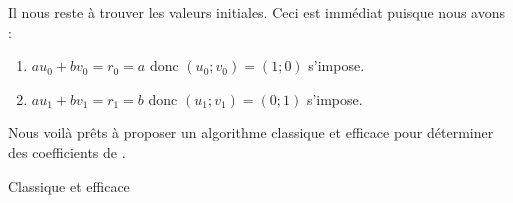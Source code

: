Il nous reste à trouver les valeurs initiales. Ceci est immédiat puisque nous avons :

\begin{enumerate}
	\item $a u_0 + b v_0 = r_0 = a$ donc $(u_0 ; v_0) = (1 ; 0)$ s'impose.

	\item $a u_1 + b v_1 = r_1 = b$ donc $(u_1 ; v_1) = (0 ; 1)$ s'impose.
\end{enumerate}


Nous voilà prêts à proposer un algorithme classique et efficace pour déterminer des coefficients de \bb.


\begin{algo}
	\caption{Classique et efficace} \label{algo-efficient}
	\addalgoblank
\end{algo}
